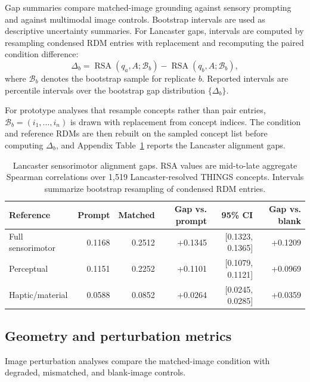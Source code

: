\documentclass{article}
\begin{document}
Gap summaries compare matched-image grounding against sensory prompting and against multimodal image controls. Bootstrap intervals are used as descriptive uncertainty summaries. For Lancaster gaps, intervals are computed by resampling condensed RDM entries with replacement and recomputing the paired condition difference:
\begin{equation}
  \Delta_b =
  \operatorname{RSA}(q_a,A;\mathcal{B}_b)
  -
  \operatorname{RSA}(q_b,A;\mathcal{B}_b),
  \label{eq:appendix_bootstrap_gap}
\end{equation}
where \(\mathcal{B}_b\) denotes the bootstrap sample for replicate \(b\). Reported intervals are percentile intervals over the bootstrap gap distribution \(\{\Delta_b\}\).

For prototype analyses that resample concepts rather than pair entries, \(\mathcal{B}_b=(i_1,\ldots,i_n)\) is drawn with replacement from concept indices. The condition and reference RDMs are then rebuilt on the sampled concept list before computing \(\Delta_b\), and Appendix Table~\ref{tab:appendix_lancaster_gaps} reports the Lancaster alignment gaps.

\begin{table}[!htbp]
\centering
\caption{Lancaster sensorimotor alignment gaps. RSA values are mid-to-late aggregate Spearman correlations over 1,519 Lancaster-resolved THINGS concepts. Intervals summarize bootstrap resampling of condensed RDM entries.}
\label{tab:appendix_lancaster_gaps}
\footnotesize
\begin{tabular}{lrrrrr}
\toprule
Reference & Prompt & Matched & Gap vs. prompt & 95\% CI & Gap vs. blank \\
\midrule
Full sensorimotor & 0.1168 & 0.2512 & +0.1345 & [0.1323, 0.1365] & +0.1209 \\
Perceptual & 0.1151 & 0.2252 & +0.1101 & [0.1079, 0.1121] & +0.0969 \\
Haptic/material & 0.0588 & 0.0852 & +0.0264 & [0.0245, 0.0285] & +0.0359 \\
\bottomrule
\end{tabular}
\end{table}

\subsection{Geometry and perturbation metrics}

Image perturbation analyses compare the matched-image condition with degraded, mismatched, and blank-image controls.
\end{document}

